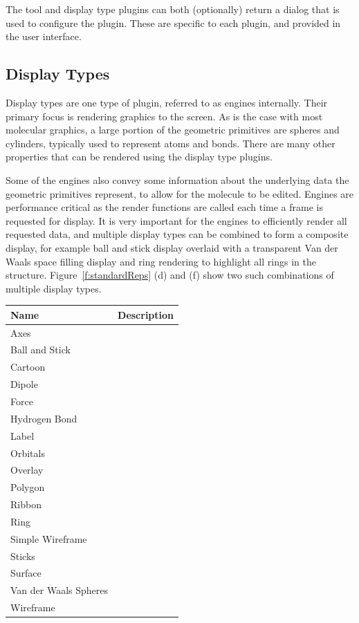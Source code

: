 \documentclass[10pt]{bmc_article}
\newenvironment{bmcformat}{\begin{raggedright}
\baselineskip20pt\sloppy\setboolean{publ}{false}}{\end{raggedright}
\baselineskip20pt\sloppy}
\begin{document}
\begin{bmcformat}
The tool and display type plugins can both (optionally) return a dialog that is
used to configure the plugin. These are specific to each plugin, and provided in
the user interface.

\subsection{Display Types}

Display types are one type of plugin, referred to as engines internally. Their
primary focus is rendering graphics to the screen. As is the case with most
molecular graphics, a large portion of the geometric primitives are spheres and
cylinders, typically used to represent atoms and bonds. There are many other
properties that can be rendered using the display type plugins.

Some of the engines also convey some information about the underlying data the
geometric primitives represent, to allow for the molecule to be edited.
Engines are performance critical as the render functions are called each time a
frame is requested for display. It is very important for the engines to
efficiently render all requested data, and multiple display types can be
combined to form a composite display, for example ball and stick display
overlaid with a transparent Van der Waals space filling display and ring
rendering to highlight all rings in the structure. Figure~\ref{f:standardReps}
(d) and (f) show two such combinations of multiple display types.

\begin{tabular}{l | l}
\hline
Name & Description \\
\hline
Axes & \\
Ball and Stick & \\
Cartoon & \\
Dipole & \\
Force & \\
Hydrogen Bond & \\
Label & \\
Orbitals & \\
Overlay & \\
Polygon & \\
Ribbon & \\
Ring & \\
Simple Wireframe & \\
Sticks & \\
Surface & \\
Van der Waals Spheres & \\
Wireframe & \\
\hline
\end{tabular}


\end{bmcformat}
\end{document}
